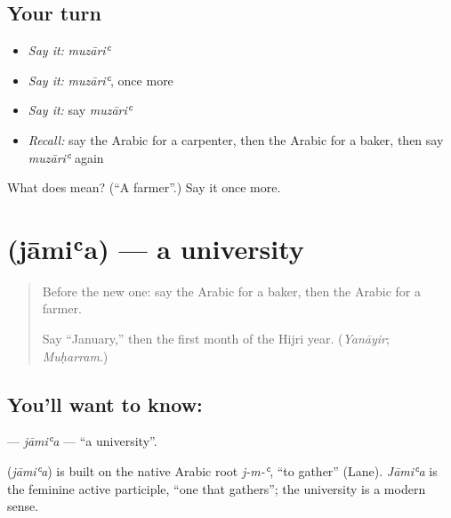 \subsection*{Your turn}
\begin{itemize}
\raggedright
  \item \emph{Say it:} \emph{muzāriʿ}
  \item \emph{Say it:} \emph{muzāriʿ}, once more
  \item \emph{Say it:} say \emph{muzāriʿ}
  \item \emph{Recall:} say the Arabic for a carpenter, then the Arabic for a baker, then say \emph{muzāriʿ} again
\end{itemize}

\begin{tcolorbox}[breakable,colback=teal!4,colframe=teal!35!black,title={Before you move on}]
What does  mean? (\textquotedblleft{}A farmer\textquotedblright{}.) Say it once more.
\end{tcolorbox}
\section[\texorpdfstring{\ar{جامعة} (jāmiʿa)}{جامعة (jāmiʿa)}]{ (jāmiʿa) — a university}

\label{lesson:AR-C144-jamia}



\begin{quote}
Before the new one: say the Arabic for a baker, then the Arabic for a farmer.

Say \textquotedblleft{}January,\textquotedblright{} then the first month of the Hijri year. (\emph{Yanāyir}; \emph{Muḥarram}.)
\end{quote}

\subsection*{You'll want to know: }
\textbf{} — \emph{jāmiʿa} — \textquotedblleft{}a university\textquotedblright{}.

\begin{cousinweb}
\textbf{} (\emph{jāmiʿa}) is built on the native Arabic root \emph{j-m-ʿ}, \textquotedblleft{}to gather\textquotedblright{} (Lane). \emph{Jāmiʿa} is the feminine active participle, \textquotedblleft{}one that gathers\textquotedblright{}; the university is a modern sense.
\end{cousinweb}

